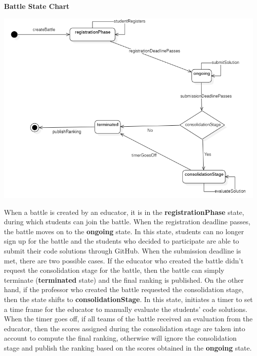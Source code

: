 \begin{minipage}{\linewidth}
\textbf{Battle State Chart}

\begin{center}
    \includegraphics[width=1\textwidth]{2Overall_Description/res/stateChartBattle.png}
\end{center}
\end{minipage}

When a battle is created by an educator, it is in the \textbf{registrationPhase} state, during which students can join the battle. When the registration deadline passes, the battle moves on to the \textbf{ongoing} state. In this state, students can no longer sign up for the battle and the students who decided to participate are able to submit their code solutions through GitHub. When the submission deadline is met, there are two possible cases. If the educator who created the battle didn't request the consolidation stage for the battle, then the battle can simply terminate (\textbf{terminated} state) and the final ranking is published. On the other hand, if the professor who created the battle requested the consolidation stage, then the state shifts to \textbf{consolidationStage}. In this state, \app initiates a timer to set a time frame for the educator to manually evaluate the students' code solutions. When the timer goes off, if all teams of the battle received an evaluation from the educator, then the scores assigned during the consolidation stage are taken into account to compute the final ranking, otherwise \app will ignore the consolidation stage and publish the ranking based on the scores obtained in the \textbf{ongoing} state.
\clearpage


